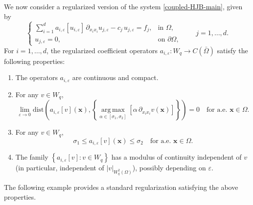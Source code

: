 \documentclass[final,onefignum,onetabnum]{mousaviart}
\newcounter{example}
\begin{document}
	We now consider a regularized version of the system \eqref{coupled-HJB-main}, given by
	\begin{equation}
		\label{coupled-HJB-regularized}
		\begin{cases}
			\displaystyle
			\sum_{i=1}^{d}
			a_{i,\varepsilon}\!\left[u_{i,\varepsilon}\right]\,
			\partial_{x_i x_i} u_{j,\varepsilon}
			-
			c_j\, u_{j,\varepsilon}
			=
			f_j,
			& \text{in } \Omega, \\[0.5em]
			u_{j,\varepsilon} = 0,
			& \text{on } \partial\Omega,
		\end{cases}
		\qquad j=1,\dots,d .
	\end{equation}
	For $i=1,\dots,d$, the regularized coefficient operators
	$a_{i,\varepsilon}\colon W_q \to C(\bar{\Omega})$ satisfy the following properties:
	\begin{enumerate}
		\item 
		The operators $a_{i,\varepsilon}$ are continuous and compact.
		\item 
		For any $v\in W_q$,
		\begin{equation}
			\label{eq:pointwise-convergence-regularized-coefficients}
			\lim_{\varepsilon \to 0}
			\text{dist}\left( 
			a_{i,\varepsilon}[v](\boldsymbol{x})
			,
			\left\lbrace  
			\operatorname*{arg\,max}_{\alpha \in [\sigma_1,\sigma_2]}
			\left[  \alpha\, \partial_{x_i x_i} v (\boldsymbol{x}) \right]  \right\rbrace \right)  = 0 
			\quad \text{for a.e.\ } \boldsymbol{x}\in\Omega .
		\end{equation}
		\item
		For any $v\in W_q$,
		\begin{equation}
			\label{ineq:uniform-bound-regularized-coefficients}
			\sigma_1 \le a_{i,\varepsilon}[v](\boldsymbol{x}) 
			\le
			\sigma_2
			\quad \text{for a.e.\ } \boldsymbol{x}\in\Omega .
		\end{equation}
		\item
		The family $\left\lbrace  a_{i, \varepsilon}[v] : v \in W_q \right\rbrace $ has a modulus of continuity independent of $v$ (in particular, independent of $\left| v \right|_{W^{2}_q(\Omega)} $), possibly depending on $\varepsilon$.
	\end{enumerate}
	The following example provides a standard regularization satisfying the above properties.
\end{document}
